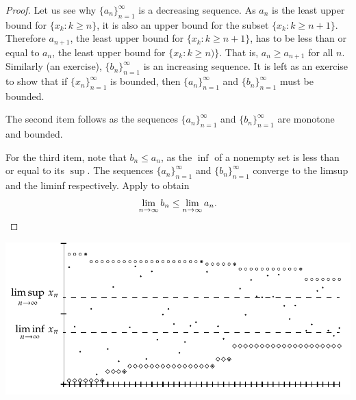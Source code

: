 \begin{proof}
Let us see why $\{ a_n \}_{n=1}^\infty$ is a decreasing sequence.  As $a_n$ is the least upper
bound for $\{ x_k : k \geq n \}$, it is also
an upper bound for the subset $\{ x_k : k \geq n+1 \}$.  Therefore
$a_{n+1}$, the least upper bound for
$\{ x_k : k \geq n+1 \}$, has to be less than or equal to $a_n$,
the least upper bound for
$\{ x_k : k \geq n) \}$.
That is,
$a_n \geq a_{n+1}$ for all $n$.  Similarly (an exercise),
$\{ b_n \}_{n=1}^\infty$ is an increasing sequence.
It is left as an exercise to show that
if $\{ x_n \}_{n=1}^\infty$ is bounded, then $\{ a_n \}_{n=1}^\infty$ and
$\{ b_n \}_{n=1}^\infty$ must be bounded.

The second item follows as the sequences
$\{ a_n \}_{n=1}^\infty$ and $\{ b_n \}_{n=1}^\infty$ are monotone and bounded.

For the third item, note that $b_n \leq a_n$, as the $\inf$ of a nonempty set
is less than or equal to its $\sup$.  The sequences $\{ a_n \}_{n=1}^\infty$
and $\{ b_n \}_{n=1}^\infty$
converge to the limsup and the liminf respectively.
Apply  to obtain
\begin{equation*}
\lim_{n\to \infty} b_n \leq \lim_{n\to \infty} a_n.  \qedhere
\end{equation*}
\end{proof}
\begin{myfigureht}
\includegraphics{figures/sequence-limsupliminf_an_bn}
\caption{First 50 terms of an example sequence.  Terms $x_n$ of the sequence are
marked with dots
(\raisebox{0.25ex}{\tiny$\bullet$}),
$a_n$ are marked with
circles ($\circ$), and
$b_n$ are marked with diamonds ($\diamond$).\label{sequence-limsupliminf_an_bn}}
\end{myfigureht}

